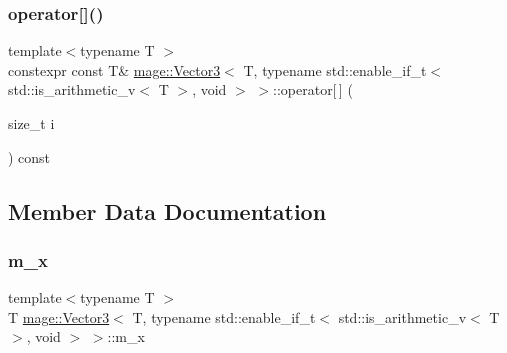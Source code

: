 \subsubsection{\texorpdfstring{operator[]()}{operator[]()}\hspace{0.1cm}{\footnotesize\ttfamily [2/2]}}
{\footnotesize\ttfamily template$<$typename T $>$ \\
constexpr const T\& \hyperlink{structmage_1_1_vector3}{mage\+::\+Vector3}$<$ T, typename std\+::enable\+\_\+if\+\_\+t$<$ std\+::is\+\_\+arithmetic\+\_\+v$<$ T $>$, void $>$ $>$\+::operator\mbox{[}$\,$\mbox{]} (\begin{DoxyParamCaption}\item[{size\+\_\+t}]{i }\end{DoxyParamCaption}) const\hspace{0.3cm}{\ttfamily [noexcept]}}



\subsection{Member Data Documentation}
\hypertarget{structmage_1_1_vector3_3_01_t_00_01typename_01std_1_1enable__if__t_3_01std_1_1is__arithmetic__v_3_01_t_01_4_00_01void_01_4_01_4_ab495c6012997584b577b5cc55299c981}{}\label{structmage_1_1_vector3_3_01_t_00_01typename_01std_1_1enable__if__t_3_01std_1_1is__arithmetic__v_3_01_t_01_4_00_01void_01_4_01_4_ab495c6012997584b577b5cc55299c981} 
\subsubsection{\texorpdfstring{m\+\_\+x}{m\_x}}
{\footnotesize\ttfamily template$<$typename T $>$ \\
T \hyperlink{structmage_1_1_vector3}{mage\+::\+Vector3}$<$ T, typename std\+::enable\+\_\+if\+\_\+t$<$ std\+::is\+\_\+arithmetic\+\_\+v$<$ T $>$, void $>$ $>$\+::m\+\_\+x}

